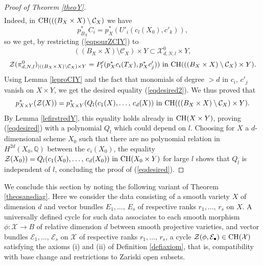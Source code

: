 \documentclass[10pt]{article}
\begin{document}
\begin{proof}[Proof of Theorem \ref{theoY}]
\begin{eqnarray}
\end{eqnarray}
 Indeed,  in ${\rm CH}(((B_X\times X)\setminus\mathcal{C}_X)$ we have $$p_{B_{X}}^*C_i=p_X^*(U'_i(c_l(X_0),c'_k)),$$  so we get, by restricting (\ref{eqpourZCIY}) to $$((B_X\times X)\setminus\mathcal{C}_X)\times Y\subset \mathcal{X}^0_{d,N,l}\times Y,$$
 \begin{eqnarray}\mathcal{Z}(\pi_{d,N,l}^0)_{\mid  ((B_X\times X)\setminus\mathcal{C}_X)\times Y}= P'_l(p_{X}^*c_i(T_X), p_X^*c'_j))\,\,{\rm in}\,\,{\rm CH}(((B_X\times X)\setminus\mathcal{C}_X)\times Y).
 \end{eqnarray}
  Using Lemma \ref{leproCIY} and the fact that monomials
of degree $>d$ in $c_i,\,c'_j$ vanish on $X\times Y$, we get the desired equality (\ref{eqdesired2}). We thus proved that
$$p_{X\times Y}^*(\mathcal{Z}(X))=p_{X\times Y}^*(Q_l(c_1(X),\ldots,\,c_d(X))\,\,{\rm in }\,\,{\rm CH}(((B_X\times X)\setminus\mathcal{C}_X)\times Y).$$
By Lemma \ref{lefirstredY}, this equality holds already in ${\rm CH}(X\times Y)$, proving
(\ref{eqdesired}) with a polynomial $Q_l$ which could depend on $l$.
Choosing for $X$ a $d$-dimensional scheme $X_0$ such that
there are no polynomial  relation in $H^{2d}(X_0,\mathbb{Q})$ between the $c_i(X_0)$,
the equality $\mathcal{Z}(X_0))=Q_l(c_1(X_0),\ldots,\,c_d(X_0))\,\,{\rm in }\,\,{\rm CH}(X_0\times Y)$
for large $l$ shows that $Q_l$ is independent of $l$, concluding the proof of (\ref{eqdesired}).
\end{proof}

We conclude this section by noting the following variant of Theorem \ref{theosansdiag}. Here we consider the data consisting of a smooth variety $X$ of dimension $d$ and vector bundles $E_1,\ldots,\,E_s$ of respective ranks $r_1,\ldots,\,r_s$  on
$X$. A universally defined cycle for such data associates to each smooth morphism
$\phi:\mathcal{X}\rightarrow B$ of relative dimension $d$ between smooth projective varieties, and vector bundles $\mathcal{E}_1,\ldots,\,\mathcal{E}_s$ on $\mathcal{X}$ of respective ranks $r_1,\ldots,\,r_s$, a cycle
$\mathcal{Z}(\phi,\mathcal{E}_\bullet)\in {\rm CH}(\mathcal{X})$ satisfying the axioms
(i) and (ii) of Definition \ref{defiaxiom}, that is, compatibility with base change and restrictions
to Zariski open subsets.
\end{document}
